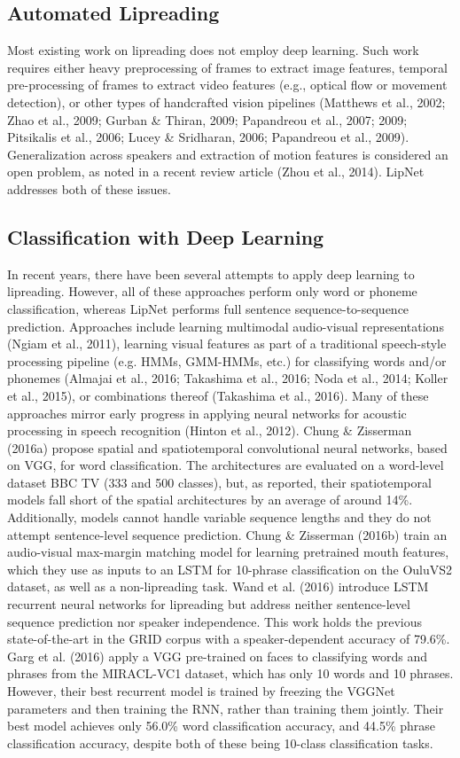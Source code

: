 \documentclass{article}
\begin{document}
\subsection{Automated Lipreading}
 Most existing work on lipreading does not employ deep learning. Such work requires either heavy preprocessing of frames to extract image features, temporal pre-processing of frames to extract video features (e.g., optical flow or movement detection), or other types of handcrafted vision pipelines (Matthews et al., 2002; Zhao et al., 2009; Gurban \& Thiran, 2009; Papandreou et al., 2007; 2009; Pitsikalis et al., 2006; Lucey \& Sridharan, 2006; Papandreou et al., 2009). Generalization across speakers and extraction of motion features is considered an open problem, as noted in a recent review article (Zhou et al., 2014). LipNet\cite{LIPNET} addresses both of these issues.
\subsection{Classification with Deep Learning}
In recent years, there have been several attempts to apply deep learning to lipreading. However, all of these approaches perform only word or phoneme classification, whereas LipNet\cite{LIPNET} performs full sentence sequence-to-sequence prediction. Approaches include learning multimodal audio-visual representations (Ngiam et al., 2011), learning visual features as part of a traditional speech-style processing pipeline (e.g. HMMs, GMM-HMMs, etc.) for classifying words and/or phonemes (Almajai et al., 2016; Takashima et al., 2016; Noda et al., 2014; Koller et al., 2015), or combinations thereof (Takashima et al., 2016). Many of these approaches mirror early progress in applying neural networks for acoustic processing in speech recognition (Hinton et al., 2012). Chung \& Zisserman (2016a) propose spatial and spatiotemporal convolutional neural networks, based on VGG, for word classification. The architectures are evaluated on a word-level dataset BBC TV (333 and 500 classes), but, as reported, their spatiotemporal models fall short of the spatial architectures by an average of around 14\%. Additionally, models cannot handle variable sequence lengths and they do not attempt sentence-level sequence prediction. 
Chung \& Zisserman (2016b) train an audio-visual max-margin matching model for learning pre\-trained mouth features, which they use as inputs to an LSTM for 10-phrase classification on the OuluVS2 dataset, as well as a non-lipreading task. Wand et al. (2016) introduce LSTM recurrent neural networks for lipreading but address neither sentence-level sequence prediction nor speaker independence. This work holds the previous state-of-the-art in the GRID corpus with a speaker-dependent accuracy of 79.6\%. Garg et al. (2016)\cite{garg2016lip} apply a VGG pre-trained on faces to classifying words and phrases from the MIRACL-VC1 dataset, which has only 10 words and 10 phrases. However, their best recurrent model is trained by freezing the VGGNet parameters and then training the RNN, rather than training them jointly. Their best model achieves only 56.0\% word classification accuracy, and 44.5\% phrase classification accuracy, despite both of these being 10-class classification tasks.
\end{document}
